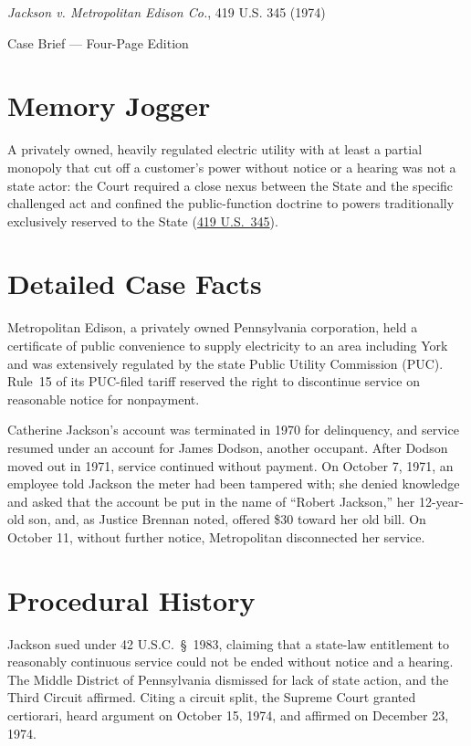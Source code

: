 \documentclass[12pt]{article}
\begin{document}
\begin{center}
{\LARGE \textit{Jackson v. Metropolitan Edison Co.}, 419 U.S. 345 (1974)\par}
\vspace{0.8em}
{\large Case Brief --- Four-Page Edition\par}
\end{center}
\vspace{1em}

\section{Memory Jogger}

A privately owned, heavily regulated electric utility with at least a partial monopoly that cut off a customer's power without notice or a hearing was not a state actor: the Court required a close nexus between the State and the specific challenged act and confined the public-function doctrine to powers traditionally exclusively reserved to the State (\href{https://supreme.justia.com/cases/federal/us/419/345/}{419 U.S.\ 345}).

\section{Detailed Case Facts}

Metropolitan Edison, a privately owned Pennsylvania corporation, held a certificate of public convenience to supply electricity to an area including York and was extensively regulated by the state Public Utility Commission (PUC). Rule~15 of its PUC-filed tariff reserved the right to discontinue service on reasonable notice for nonpayment.

Catherine Jackson's account was terminated in 1970 for delinquency, and service resumed under an account for James Dodson, another occupant. After Dodson moved out in 1971, service continued without payment. On October 7, 1971, an employee told Jackson the meter had been tampered with; she denied knowledge and asked that the account be put in the name of ``Robert Jackson,'' her 12-year-old son, and, as Justice Brennan noted, offered \$30 toward her old bill. On October 11, without further notice, Metropolitan disconnected her service.

\section{Procedural History}

Jackson sued under 42 U.S.C.\ \S\ 1983, claiming that a state-law entitlement to reasonably continuous service could not be ended without notice and a hearing. The Middle District of Pennsylvania dismissed for lack of state action, and the Third Circuit affirmed. Citing a circuit split, the Supreme Court granted certiorari, heard argument on October 15, 1974, and affirmed on December 23, 1974.
\end{document}
